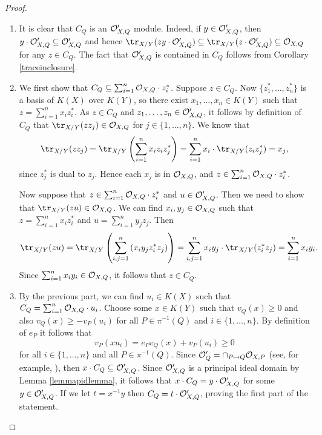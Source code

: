     \begin{proof}
        \begin{enumerate}
        \item It is clear that $C_Q$ is an ${\cal O}_{X,Q}'$ module.
        Indeed, if $y\in {\cal O}_{X,Q}'$, then $y\cdot {\cal O}_{X,Q}' \subseteq {\cal O}_{X,Q}'$ and hence $\tr_{X/Y}(z y\cdot \cO_{X,Q}')\subseteq \tr_{X/Y}(z\cdot \cO_{X,Q}') \subseteq \cO_{X,Q}$ for any $z\in C_Q$.
        The fact that ${\cal O}_{X,Q}'$ is contained in $C_Q$ follows from Corollary \ref{traceinclosure}.
        \item We first show that $C_Q \subseteq \sum_{i=1}^n {\cal O}_{X,Q}\cdot z_i^*$.
        Suppose $z\in C_Q$.
        Now $\{z_1^*, \ldots ,z_n^*\}$ is a basis of $K(X)$ over $K(Y)$, so there exist $x_1,\ldots , x_n\in K(Y)$ such that $z=\sum_{i=1}^n x_iz_i^*$.
        As $z\in C_Q$ and $z_1,\ldots ,z_n\in {\cal O}_{X,Q}'$, it follows by definition of $C_Q$ that $\tr_{X/Y}(zz_j)\in \cO_{X,Q}$ for $j\in \{1,\ldots ,n\}$.
        We know that 
            \[
            \tr_{X/Y}(zz_j) = \tr_{X/Y}\left(\sum_{i=1}^nx_iz_iz_j^*\right) = \sum_{i=1}^nx_i \cdot \tr_{X/Y}(z_iz_j^*) = x_j,
            \]
        since $z_j^*$ is dual to $z_j$.
        Hence each $x_j$ is in ${\cal O}_{X,Q}$, and $z\in \sum_{i=1}^n{\cal O}_{X,Q}\cdot z_i^*$.
        
        Now suppose that $z\in \sum_{i=1}^n{\cal O}_{X,Q}\cdot z_i^*$ and $u\in {\cal O}_{X,Q}'$.
        Then we need to show that $\tr_{X/Y}(z u)\in \cO_{X,Q}$.
        We can find $x_i, y_j\in {\cal O}_{X,Q}$ such that $z=\sum_{i=1}^n x_iz_i^*$ and $u=\sum_{i=1}^ny_jz_j$.
        Then
            \[
            \tr_{X/Y}(zu) = \tr_{X/Y}\left(\sum_{i,j=1}^n \left(x_iy_jz_i^*z_j\right)\right) = \sum_{i,j=1}^n x_iy_j\cdot \tr_{X/Y}(z_i^*z_j) = \sum_{i=1}^n x_iy_i.
            \]
        Since $\sum_{i=1}^n x_iy_i\in {\cal O}_{X,Q}$, it follows that $z\in C_Q$.
        \item By the previous part, we can find $u_i\in K(X)$ such that $C_Q = \sum_{i=1}^n {\cal O}_{X,Q} \cdot u_i$.
        Choose some $x\in K(Y)$ such that $v_Q(x)\geq 0$ and also $v_Q(x)\geq -v_P(u_i)$ for all $P\in \pi^{-1}(Q)$ and $i\in \{1,\ldots ,n\}$.
        By definition of $e_P$ it follows that
            \[ 
            v_P(xu_i) = e_Pv_Q(x) + v_P(u_i) \geq 0
            \]
        for all $i\in \{1,\ldots, n\}$ and all $P\in \pi^{-1}(Q)$.
        Since ${\cal O}'_Q = \cap_{P\mapsto Q} {\cal O}_{X,P}$ (see, for example, \cite[Cor. 3.3.5]{stichtenoth}), then $x\cdot C_Q \subseteq {\cal O}_{X,Q}'$.
        Since ${\cal O}_{X,Q}'$ is a principal ideal domain by Lemma \ref{lemmapidlemma}, it follows that $x\cdot C_Q = y\cdot {\cal O}_{X,Q}'$ for some $y\in {\cal O}_{X,Q}'$.
        If we let $t=x^{-1}y$ then $C_Q =t\cdot {\cal O}_{X,Q}'$, proving the first part of the statement.
        

\end{enumerate}
\end{proof}
